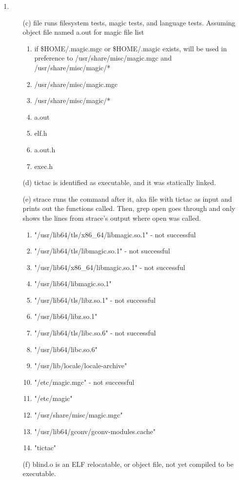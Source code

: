 \documentclass[12pt,letterpaper]{report}
\begin{document}
\begin{enumerate}
\item 
\begin{enumerate}
\item[(c)] file runs filesystem tests, magic tests, and language tests. Assuming object file named a.out for magic file list
\begin{enumerate}
\item if \$HOME/.magic.mgc or \$HOME/.magic exists, will be used in preference to /usr/share/misc/magic.mgc and /usr/share/misc/magic/*
\item /usr/share/misc/magic.mgc
\item /usr/share/misc/magic/*
\item a.out
\item elf.h
\item a.out.h
\item exec.h
\end{enumerate}
\item[(d)] tictac is identified as executable, and it was statically linked.
\item[(e)] strace runs the command after it, aka file with tictac as input and prints out the functions called. Then, grep open goes through and only shows the lines from strace's output where open was called.
\begin{enumerate}
\item "/usr/lib64/tls/x86\_64/libmagic.so.1" - not successful
\item "/usr/lib64/tls/libmagic.so.1" - not successful
\item "/usr/lib64/x86\_64/libmagic.so.1" - not successful
\item "/usr/lib64/libmagic.so.1"
\item "/usr/lib64/tls/libz.so.1" - not successful
\item "/usr/lib64/libz.so.1" 
\item "/usr/lib64/tls/libc.so.6" - not successful
\item "/usr/lib64/libc.so.6"
\item "/usr/lib/locale/locale-archive"
\item "/etc/magic.mgc" - not successful
\item "/etc/magic"
\item "/usr/share/misc/magic.mgc"
\item "/usr/lib64/gconv/gconv-modules.cache"
\item "tictac"
\end{enumerate}
\item[(f)] blind.o is an ELF relocatable, or object file, not yet compiled to be executable.

\end{enumerate}
\end{enumerate}
\end{document}
